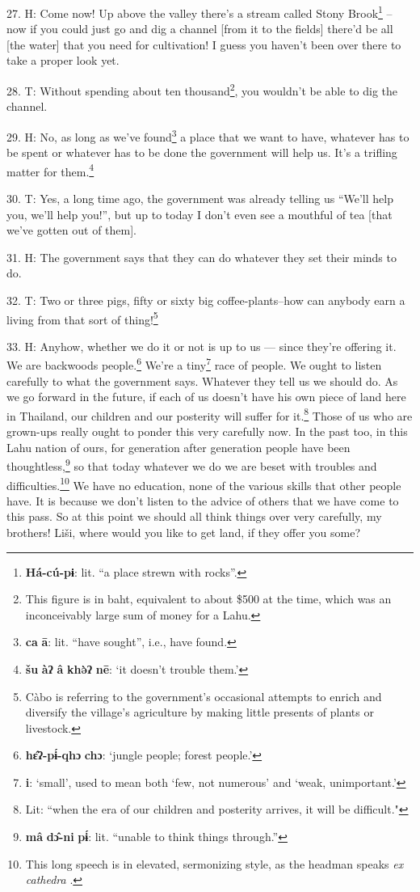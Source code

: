27. H: Come now! Up above the valley there's a stream called Stony Brook\footnote{\textbf{Há-cú-pɨ}: lit. ``a place strewn with rocks''.} --
now if you could just go and dig a channel [from it to the fields] there'd be all
[the water] that you need for cultivation! I guess you haven't been over there
to take a proper look yet.

28. T: Without spending about ten thousand\footnote{This figure is in baht, equivalent to about \$500 at the time, which was an inconceivably large sum of money for a Lahu.}, you wouldn't be able to dig
the channel.

29. H: No, as long as we've found\footnote{\textbf{ca} \textbf{ā}: lit. ``have sought'', i.e., have found.} a place that we want to have, whatever has
to be spent or whatever has to be done the government will help us. It's a trifling
matter for them.\footnote{\textbf{šu} \textbf{àʔ} \textbf{â} \textbf{khə̀ʔ} \textbf{nē}: `it doesn't trouble them.'}

30. T: Yes, a long time ago, the government was already telling us ``We'll
help you, we'll help you!'', but up to today I don't even see a mouthful of tea
[that we've gotten out of them].

31. H: The government says that they can do whatever they set their minds to do.

32. T: Two or three pigs, fifty or sixty big coffee-plants--how can anybody
earn a living from that sort of thing!\footnote{Càbo is referring to the government's occasional attempts to enrich and diversify the village's agriculture by making little presents of plants or livestock.}

33. H: Anyhow, whether we do it or not is up to us --- since they're offering it.
We are backwoods people.\footnote{\textbf{hɛ̂ʔ-pɨ́-qhɔ} \textbf{chɔ}: `jungle people; forest people.'} We're a tiny\footnote{\textbf{i}: `small', used to mean both `few, not numerous' and `weak, unimportant.'} race of people. We ought to listen
carefully to what the government says. Whatever they tell us we should do. As we
go forward in the future, if each of us doesn't have his own piece of land here
in Thailand, our children and our posterity will suffer for it.\footnote{Lit: ``when the era of our children and posterity arrives, it will be difficult."} Those of us
who are grown-ups really ought to ponder this very carefully now. In the past too,
in this Lahu nation of ours, for generation after generation people have been thoughtless,\footnote{\textbf{mâ} \textbf{dɔ̂-ni} \textbf{pɨ́}: lit. ``unable to think things through.''}
so that today whatever we do we are beset with troubles and difficulties.\footnote{This long speech is in elevated, sermonizing style, as the headman speaks \textit{ex cathedra }.} We
have no education, none of the various skills that other people have. It is because
we don't listen to the advice of others that we have come to this pass. So at this
point we should all think things over very carefully, my brothers! Liši, where
would you like to get land, if they offer you some?

